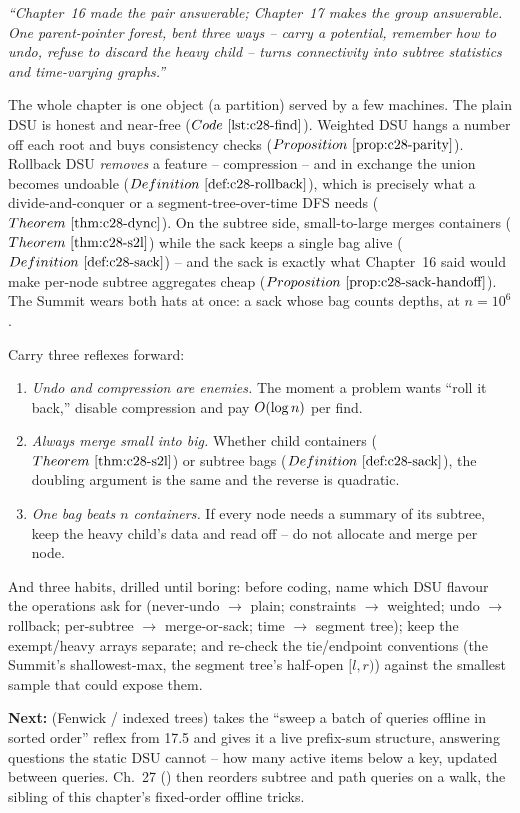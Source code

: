 \begin{lastword}
\emph{``Chapter~16 made the pair answerable; Chapter~17 makes the group
answerable. One parent-pointer forest, bent three ways -- carry a potential,
remember how to undo, refuse to discard the heavy child -- turns connectivity
into subtree statistics and time-varying graphs.''}

\medskip
The whole chapter is one object (a partition) served by a few machines. The
plain DSU is honest and near-free (\(\coderef{c28-find}\)). Weighted DSU hangs a
number off each root and buys consistency checks (\(\propref{c28-parity}\)).
Rollback DSU \emph{removes} a feature -- compression -- and in exchange the union
becomes undoable (\(\defref{c28-rollback}\)), which is precisely what a
divide-and-conquer or a segment-tree-over-time DFS needs
(\(\thmref{c28-dync}\)). On the subtree side, small-to-large merges containers
(\(\thmref{c28-s2l}\)) while the sack keeps a single bag alive
(\(\defref{c28-sack}\)) -- and the sack is exactly what Chapter~16 said would
make per-node subtree aggregates cheap (\(\propref{c28-sack-handoff}\)). The
Summit wears both hats at once: a sack whose bag counts depths, at \(n=10^6\).

\medskip
Carry three reflexes forward:
\begin{enumerate}[nosep, leftmargin=1.6em]
  \item \emph{Undo and compression are enemies.} The moment a problem wants
        ``roll it back,'' disable compression and pay \(O(\log n)\) per find.
  \item \emph{Always merge small into big.} Whether child containers
        (\(\thmref{c28-s2l}\)) or subtree bags (\(\defref{c28-sack}\)), the
        doubling argument is the same and the reverse is quadratic.
  \item \emph{One bag beats \(n\) containers.} If every node needs a summary of
        its subtree, keep the heavy child's data and read off -- do not allocate
        and merge per node.
\end{enumerate}

\medskip
And three habits, drilled until boring: before coding, name which DSU flavour the
operations ask for (never-undo \(\to\) plain; constraints \(\to\) weighted; undo
\(\to\) rollback; per-subtree \(\to\) merge-or-sack; time \(\to\) segment tree);
keep the exempt/heavy arrays separate; and re-check the tie/endpoint conventions
(the Summit's shallowest-max, the segment tree's half-open \([l,r)\)) against the
smallest sample that could expose them.

\medskip
\textbf{Next:}  (Fenwick / indexed trees) takes the ``sweep a batch
of queries offline in sorted order'' reflex from 17.5 and gives it a live
prefix-sum structure, answering questions the static DSU cannot -- how many
active items below a key, updated between queries. Ch.~27 () then
reorders subtree and path queries on a walk, the sibling of this chapter's
fixed-order offline tricks.
\end{lastword}
